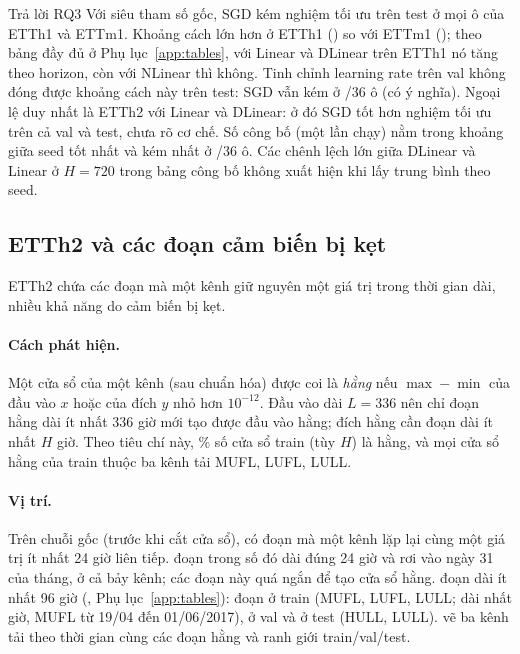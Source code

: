 \begin{guidelinebox}{Trả lời RQ3}
Với siêu tham số gốc, SGD kém nghiệm tối ưu trên test ở mọi ô của ETTh1 và ETTm1. Khoảng cách lớn hơn ở ETTh1 (\nmBFourETThOneDTestRange) so với ETTm1 (\nmBFourETTmOneDTestRange); theo bảng đầy đủ ở Phụ lục~\ref{app:tables}, với Linear và DLinear trên ETTh1 nó tăng theo horizon, còn với NLinear thì không. Tinh chỉnh learning rate trên val không đóng được khoảng cách này trên test: SGD vẫn kém ở \nmTunedWorseSigCount/36 ô (có ý nghĩa). Ngoại lệ duy nhất là ETTh2 với Linear và DLinear: ở đó SGD tốt hơn nghiệm tối ưu trên cả val và test, chưa rõ cơ chế. Số công bố (một lần chạy) nằm trong khoảng giữa seed tốt nhất và kém nhất ở \nmBOneInsideCount/36 ô. Các chênh lệch lớn giữa DLinear và Linear ở $H = 720$ trong bảng công bố không xuất hiện khi lấy trung bình theo seed.
\end{guidelinebox}

\subsection{ETTh2 và các đoạn cảm biến bị kẹt}
\label{sec:etth2}

ETTh2 chứa các đoạn mà một kênh giữ nguyên một giá trị trong thời gian dài, nhiều khả năng do cảm biến bị kẹt.

\paragraph{Cách phát hiện.} Một cửa sổ của một kênh (sau chuẩn hóa) được coi là \emph{hằng} nếu $\max - \min$ của đầu vào $x$ hoặc của đích $y$ nhỏ hơn $10^{-12}$. Đầu vào dài $L = 336$ nên chỉ đoạn hằng dài ít nhất 336 giờ mới tạo được đầu vào hằng; đích hằng cần đoạn dài ít nhất $H$ giờ. Theo tiêu chí này, \nmEThTwoConstTrainPctRange\% số cửa sổ train (tùy $H$) là hằng, và mọi cửa sổ hằng của train thuộc ba kênh tải MUFL, LUFL, LULL.

\paragraph{Vị trí.} Trên chuỗi gốc (trước khi cắt cửa sổ), có \nmStuckRunCount{} đoạn mà một kênh lặp lại cùng một giá trị ít nhất 24 giờ liên tiếp. \nmStuckDayThirtyOneCount{} đoạn trong số đó dài đúng 24 giờ và rơi vào ngày 31 của tháng, ở cả bảy kênh; các đoạn này quá ngắn để tạo cửa sổ hằng. \nmStuckRunLongCount{} đoạn dài ít nhất 96 giờ (, Phụ lục~\ref{app:tables}): \nmStuckRunLongTrainCount{} đoạn ở train (MUFL, LUFL, LULL; dài nhất \nmStuckRunMaxHours{} giờ, MUFL từ 19/04 đến 01/06/2017), \nmStuckRunLongValCount{} ở val và \nmStuckRunLongTestCount{} ở test (HULL, LULL).  vẽ ba kênh tải theo thời gian cùng các đoạn hằng và ranh giới train/val/test.

